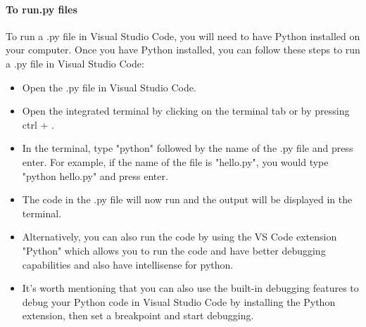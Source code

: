\paragraph{To run.py files}
To run a .py file in Visual Studio Code, you will need to have Python installed on your computer. Once you have Python installed, you can follow these steps to run a .py file in Visual Studio Code:
\begin{itemize}
	\item Open the .py file in Visual Studio Code.
	\item Open the integrated terminal by clicking on the terminal tab or by pressing ctrl + .
	\item In the terminal, type "python" followed by the name of the .py file and press enter. For example, if the name of the file is "hello.py", you would type "python hello.py" and press enter.
	\item The code in the .py file will now run and the output will be displayed in the terminal.
	\item Alternatively, you can also run the code by using the VS Code extension "Python" which allows you to run the code and have better debugging capabilities and also have intellisense for python.
	\item It's worth mentioning that you can also use the built-in debugging features to debug your Python code in Visual Studio Code by installing the Python extension, then set a breakpoint and start debugging.
\end{itemize}







